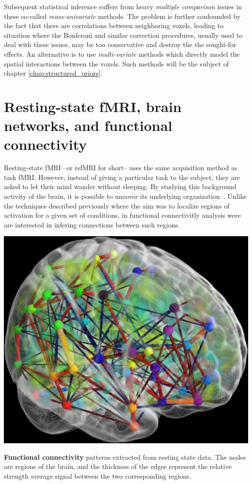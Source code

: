 Subsequent statistical inference suffers from heavy \textit{multiple comparison} issues in these so-called \textit{mass-univariate} methods.
%
The problem
is further confounded by the fact that there are correlations between neighboring voxels, leading to  situation where the Bonferoni and similar correction procedures, usually used to deal with these issues, may be too conservative and destroy the the sought-for effects.
%
An alternative is to use \textit{multi-variate} methods which directly model the spatial interactions between the voxels. Such methods will be the subject of chapter \ref{chap:structured_priors}.

\section{Resting-state fMRI, brain networks, and functional connectivity}
\label{sec:rsfmri}
Resting-state fMRI --or rsfMRI for short-- uses the same acquisition method as task fMRI.
However, instead of giving a particular task to the subject, they are asked to let their mind wander without sleeping. By studying this background activity of
the brain, it is possible to uncover its underlying organization~\citep{raichle10}. Unlike the techniques described previously where the aim was to localize regions of activation for a given set of conditions, in functional connectivitly analysis were are interested in infering connections between such regions.

\begin{marginfigure}%
  \includegraphics[width=1\linewidth]{figures/connectome.png}
  \caption{\textbf{Functional connectivity} patterns extracted from resting state data. The nodes are regions of the brain, and the thickness
  of the edges represent the relative strength average signal between the two corresponding regions.}
\end{marginfigure}

